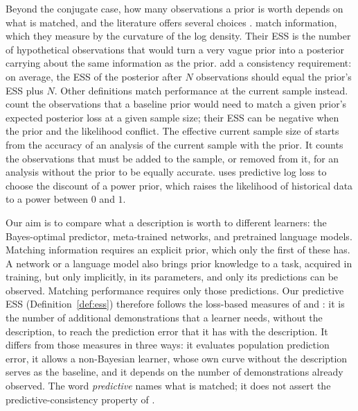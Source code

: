 Beyond the conjugate case, how many observations a prior is worth depends on what is matched, and the literature offers several choices \citep{morita2008,neuenschwander2020}. \citet{morita2008} match information, which they measure by the curvature of the log density. Their ESS is the number of hypothetical observations that would turn a very vague prior into a posterior carrying about the same information as the prior. \citet{neuenschwander2020} add a consistency requirement: on average, the ESS of the posterior after $N$ observations should equal the prior's ESS plus $N$. Other definitions match performance at the current sample instead. \citet{reimherr2021} count the observations that a baseline prior would need to match a given prior's expected posterior loss at a given sample size; their ESS can be negative when the prior and the likelihood conflict. The effective current sample size of \citet{wiesenfarth2020} starts from the accuracy of an analysis of the current sample with the prior. It counts the observations that must be added to the sample, or removed from it, for an analysis without the prior to be equally accurate. \citet{reznik2026} uses predictive log loss to choose the discount of a power prior, which raises the likelihood of historical data to a power between $0$ and $1$.

Our aim is to compare what a description is worth to different learners: the Bayes-optimal predictor, meta-trained networks, and pretrained language models. Matching information requires an explicit prior, which only the first of these has. A network or a language model also brings prior knowledge to a task, acquired in training, but only implicitly, in its parameters, and only its predictions can be observed. Matching performance requires only those predictions. Our predictive ESS (Definition~\ref{def:ess}) therefore follows the loss-based measures of \citet{reimherr2021} and \citet{wiesenfarth2020}: it is the number of additional demonstrations that a learner needs, without the description, to reach the prediction error that it has with the description. It differs from those measures in three ways: it evaluates population prediction error, it allows a non-Bayesian learner, whose own curve without the description serves as the baseline, and it depends on the number of demonstrations already observed. The word \emph{predictive} names what is matched; it does not assert the predictive-consistency property of \citet{neuenschwander2020}.

